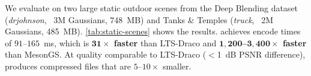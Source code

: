 \begin{table}[t]
  \centering
  \footnotesize
  \caption{Static \gs{} scene compression. PSNR, SSIM, and LPIPS computed on rendered test views.}
  \label{tab:static-scenes}
\end{table}

%
We evaluate \gsnfs{} on two large static outdoor scenes from the Deep Blending dataset (\textit{drjohnson}, ~3M Gaussians, 748~MB) and Tanks \& Temples (\textit{truck}, ~2M Gaussians, 485~MB).
%
%
\cref{tab:static-scenes} shows the results.
%
\gsnfs{} achieves encode times of $91$--$165$~ms, which is \textbf{$\boldsymbol{31\times}$ faster} than LTS-Draco and \textbf{$\boldsymbol{1{,}200}$--$\boldsymbol{3{,}400\times}$ faster} than MesonGS.
%
At quality comparable to LTS-Draco ($<$1~dB PSNR difference), \gsnfs{} produces compressed files that are $5$--$10\times$ smaller.
%

